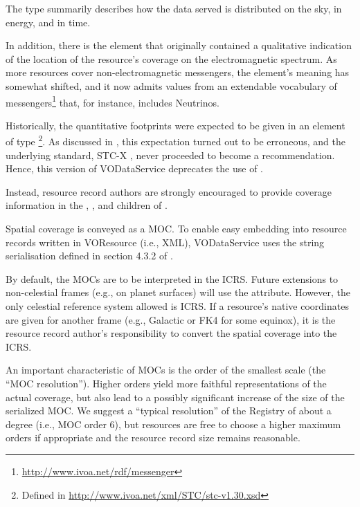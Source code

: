 \documentclass[11pt,a4paper]{ivoa}
\begin{document}
The  type summarily describes how the data served is
distributed on the
sky, in energy, and in time.

In addition, there is the  element that originally
contained a qualitative indication of the location of the resource's
coverage on the electromagnetic spectrum.  As more resources cover
non-elec\-tromagnetic messengers, the element's meaning has somewhat
shifted, and it now admits values from an extendable vocabulary of
messengers\footnote{\url{http://www.ivoa.net/rdf/messenger}} that, for
instance, includes Neutrinos.

Historically, the quantitative footprints were expected to be given in
an element of type \footnote{Defined in
\url{http://www.ivoa.net/xml/STC/stc-v1.30.xsd}}.  As discussed in
\citet{note:regstc}, this expectation turned out to be erroneous,
and the underlying standard, STC-X \citep{note:stcx}, never proceeded to become
a recommendation.  Hence, this version of VODataService deprecates the
use of .

Instead, resource record authors are strongly encouraged to provide
coverage information in the , , and
 children of .

Spatial coverage is conveyed as a MOC.  To enable easy embedding into
resource records written in VOResource (i.e., XML),
VODataService uses the string serialisation defined in section 4.3.2 of
\citet{2022ivoa.spec.0727F}.

By default, the MOCs are to be interpreted in the ICRS.  Future
extensions to non-celestial frames (e.g., on planet
surfaces) will use the  attribute.
However, the only celestial reference system allowed is
ICRS.  If a resource's native coordinates are given for another frame (e.g.,
Galactic or FK4 for some equinox), it is the resource record author's
responsibility to convert the spatial coverage into the ICRS.

An important characteristic of MOCs is the order of the smallest scale
(the ``MOC resolution'').  Higher orders yield more faithful
representations of the actual coverage, but also lead to a possibly
significant increase of the size of the serialized MOC.  We suggest a
``typical resolution'' of the Registry of about a degree (i.e., MOC
order 6), but resources are free to choose a higher maximum orders if
appropriate and the resource record size remains reasonable.
\end{document}
